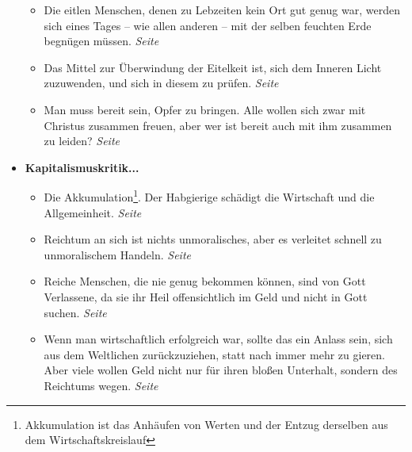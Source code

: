 \begin{itemize}
\begin{itemize}
 \item Die eitlen Menschen, denen zu Lebzeiten kein Ort gut genug war,
werden sich eines Tages -- wie allen anderen -- mit der selben feuchten Erde
begnügen müssen.
 \dotfill \textit{Seite~\pageref{ref:12_10_eitle_menschen_tod}}\\

 \item Das Mittel zur Überwindung der Eitelkeit ist, sich dem Inneren Licht
zuzuwenden, und sich in diesem zu prüfen.
 \dotfill \textit{Seite~\pageref{ref:12_11_eitle_menschen_erloesung}}\\

 \item Man muss bereit sein, Opfer zu bringen. Alle wollen sich zwar mit Christus
zusammen freuen, aber wer ist bereit auch mit ihm zusammen zu leiden?
 \dotfill \textit{Seite~\pageref{ref:12_11_opfer}}\\

 \end{itemize}


 \item \textbf{Kapitalismuskritik...}

\begin{itemize}
 \item Die Akkumulation\footnote{Akkumulation ist das Anhäufen von Werten und
der Entzug derselben aus dem Wirtschaftskreislauf}. Der Habgierige schädigt die
Wirtschaft und die Allgemeinheit.
 \dotfill \textit{Seite~\pageref{ref:13_01_accumlation}}\\

 \item Reichtum an sich ist nichts unmoralisches, aber es verleitet schnell zu
unmoralischem Handeln.
 \dotfill \textit{Seite~\pageref{ref:13_05_reichtum}}\\

 \item Reiche Menschen, die nie genug bekommen können, sind von Gott Verlassene,
da sie ihr Heil offensichtlich im Geld und nicht in Gott suchen.
 \dotfill \textit{Seite~\pageref{ref:13_06_reichtum_unersaettlichkeit}}\\

 \item Wenn man wirtschaftlich erfolgreich war, sollte das ein Anlass sein, sich
aus dem Weltlichen zurückzuziehen, statt nach immer mehr zu gieren. Aber viele
wollen Geld nicht nur für ihren bloßen Unterhalt, sondern des Reichtums wegen.
 \dotfill \textit{Seite~\pageref{ref:13_07_reichtum_genuegsamkeit}}\\


\end{itemize}
\end{itemize}
